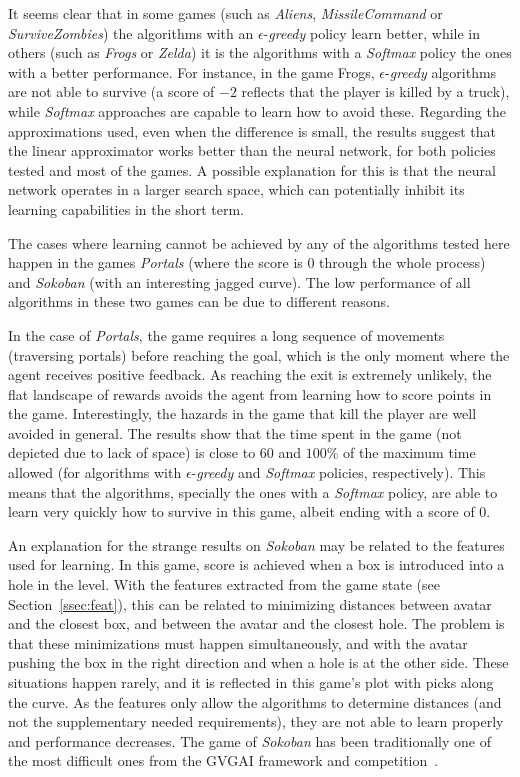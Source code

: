 \documentclass[conference]{IEEEtran}
\begin{document}
It seems clear that in some games (such as \textit{Aliens}, \textit{MissileCommand} or \textit{SurviveZombies}) the algorithms with an $\epsilon$-\textit{greedy} policy learn better, while in others (such as \textit{Frogs} or \textit{Zelda}) it is the algorithms with a \textit{Softmax} policy the ones with a better performance. For instance, in the game Frogs, $\epsilon$-\textit{greedy} algorithms are not able to survive (a score of $-2$ reflects that the player is killed by a truck), while \textit{Softmax}  approaches are capable to learn how to avoid these. Regarding the approximations used, even when the difference is small, the results suggest that the linear approximator works better than the neural network, for both policies tested and most of the games. A possible explanation for this is that the neural network operates in a larger search space, which can potentially inhibit its learning capabilities in the short term.

The cases where learning cannot be achieved by any of the algorithms tested here happen in the games \textit{Portals} (where the score is $0$ through the whole process) and \textit{Sokoban} (with an interesting jagged curve). The low performance of all algorithms in these two games can be due to different reasons.

In the case of \textit{Portals}, the game requires a long sequence of movements (traversing portals) before reaching the goal, which is the only moment where the agent receives positive feedback. As reaching the exit is extremely unlikely, the flat landscape of rewards avoids the agent from learning how to score points in the game. Interestingly, the hazards in the game that kill the player are well avoided in general. The results show that the time spent in the game (not depicted due to lack of space) is close to $60$ and $100\%$ of the maximum time allowed (for algorithms with $\epsilon$-\textit{greedy} and \textit{Softmax} policies, respectively). This means that the algorithms, specially the ones with a \textit{Softmax} policy, are able to learn very quickly how to survive in this game, albeit ending with a score of $0$.

An explanation for the strange results on \textit{Sokoban} may be related to the features used for learning. In this game, score is achieved when a box is introduced into a hole in the level. With the features extracted from the game state (see Section~\ref{ssec:feat}), this can be related to minimizing distances between avatar and the closest box, and between the avatar and the closest hole. The problem is that these minimizations must happen simultaneously, and with the avatar pushing the box in the right direction and when a hole is at the other side. These situations happen rarely, and it is reflected in this game's plot with picks along the curve. As the features only allow the algorithms to determine distances (and not the supplementary needed requirements), they are not able to learn properly and performance decreases. The game of \textit{Sokoban} has been traditionally one of the most difficult ones from the GVGAI framework and competition~\cite{Perez2015}.
\end{document}
